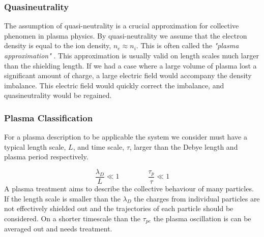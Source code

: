 		\subsubsection{Quasineutrality}
		The assumption of quasi-neutrality is a crucial approximation for collective phenomen in plasma
		physics. By quasi-neutrality we assume that the electron
		density is equal to the ion density, \(n_e \approx n_i\). This is often called the
		\textit{"plasma approximation"} \citep{chen_introduction_1984}.
		This approximation is usually valid on length scales much larger than the shielding
		length. If we had a case where a large volume of plasma lost a significant
		amount of charge, a large electric field would accompany the density imbalance.
		This electric field would quickly correct the imbalance, and quasineutrality
		would be regained.

		\subsubsection{Plasma Classification}
        For a plasma description to be applicable the system we consider must have
        a typical length scale, \(L\), and time scale, \(\tau\), larger than the Debye length and plasma
        period respectively.

        \[\frac{\lambda_D}{L} \ll 1  \qquad{} \qquad \frac{\tau_p}{\tau} \ll 1 \]
		A plasma treatment aims to describe the collective behaviour of many particles.
		If the length scale is smaller than the \(\lambda_D\) the charges from
		individual particles are not effectively shielded out and the trajectories of each particle should
		be considered. On a shorter timescale than the \(\tau_{pe}\) the plasma oscillation is can be averaged
		out and needs treatment.

















